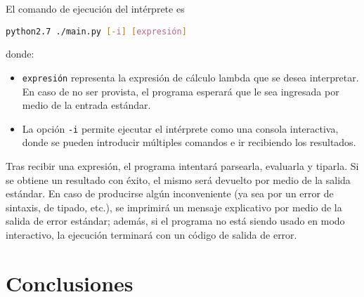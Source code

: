 \documentclass[11pt]{article}
\begin{document}
El comando de ejecución del intérprete es
\begin{center}\lstinline[language=bash]
	{python2.7 ./main.py [-i] [expresión]}
\end{center}
\noindent donde:

\begin{itemize}
\item \verb|expresión| representa la expresión de cálculo lambda que se
	desea interpretar. En caso de no ser provista, el programa esperará que le
    sea ingresada por medio de la entrada estándar.
\item La opción \verb|-i| permite ejecutar el intérprete como una consola
	interactiva, donde se pueden introducir múltiples comandos e ir recibiendo
    los resultados.
\end{itemize}

Tras recibir una expresión, el programa intentará parsearla, evaluarla y
tiparla. Si se obtiene un resultado con éxito, el mismo será devuelto por
medio de la salida estándar. En caso de producirse algún inconveniente
(ya sea por un error de sintaxis, de tipado, etc.), se imprimirá un mensaje
explicativo por medio de la salida de error estándar; además, si el programa
no está siendo usado en modo interactivo, la ejecución terminará con un código
de salida de error.


\section{Conclusiones}




\printbibliography

\end{document}
